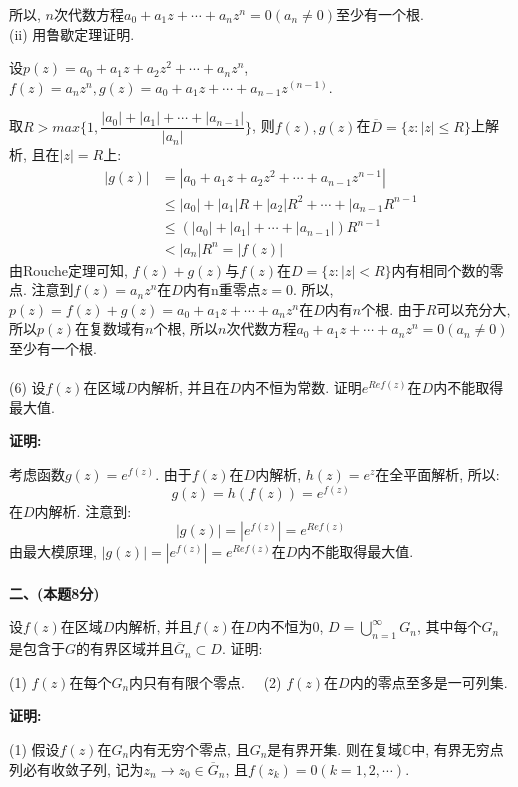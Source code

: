 \documentclass{article}
\begin{document}
所以, $n$次代数方程$a_0 + a_1z + \cdots + a_n z^n =0(a_n \neq 0)$至少有一个根. \\

(ii) 用鲁歇定理证明. 

设$p(z) = a_0 + a_1z + a_2z^2 + \cdots + a_nz^n$, $f(z) = a_n z^n, g(z) = a_0 + a_1 z + \cdots + a_{n-1}z^{(n-1)}$. 

取$R > max \{1, \dfrac{|a_0| + |a_1| + \cdots + |a_{n-1}|}{|a_n|} \}$, 则$f(z), g(z)$在$\overline{D} = \{ z: |z| \leq R \}$上解析, 且在$|z| = R$上:
\begin{align*}
|g(z)| &= |a_0 + a_1z + a_2z^2 + \cdots + a_{n-1}z^{n-1}| \\
       & \leq |a_0| + |a_1|R + |a_2|R^2 + \cdots + |a_{n-1}R^{n-1} \\
       & \leq \left(|a_0| + |a_1| + \cdots + |a_{n-1}|  \right) R^{n-1} \\
       & < |a_n|R^n = |f(z)|
\end{align*}
由Rouche定理可知, $f(z) + g(z)$与$f(z)$在$D = \{z:|z|<R  \}$内有相同个数的零点. 注意到$f(z) = a_nz^n$在$D$内有n重零点$z=0$. 所以, $p(z) = f(z) + g(z) = a_0 + a_1 z + \cdots + a_nz^n$在$D$内有$n$个根. 由于$R$可以充分大, 所以$p(z)$在复数域有$n$个根, 所以$n$次代数方程$a_0 + a_1z + \cdots + a_n z^n =0(a_n \neq 0)$至少有一个根.  \\  \\


(6) 设$f(z)$在区域$D$内解析, 并且在$D$内不恒为常数. 证明$e^{Re f(z)}$在$D$内不能取得最大值.

\textbf{证明:} 

考虑函数$g(z) = e^{f(z)}$. 由于$f(z)$在$D$内解析, $h(z)= e^z$在全平面解析, 所以:
$$ g(z) = h(f(z)) = e^{f(z)} $$
在$D$内解析. 注意到:
$$ |g(z)| = |e^{f(z)}| = e^{Re f(z)} $$
由最大模原理, $|g(z)| = |e^{f(z)}| = e^{Ref(z)}$在$D$内不能取得最大值. \\  \\

\textbf{二、(本题8分)}

设$f(z)$在区域$D$内解析, 并且$f(z)$在$D$内不恒为0, $D = \bigcup\limits_{n=1}^{\infty} G_n$, 其中每个$G_n$是包含于$G$的有界区域并且$\overline{G}_n \subset D$. 证明:

(1) $f(z)$在每个$G_n$内只有有限个零点. \ \ (2) $f(z)$在$D$内的零点至多是一可列集. 

\textbf{证明:} 

(1) 假设$f(z)$在$G_n$内有无穷个零点, 且$G_n$是有界开集. 则在复域$\mathbb{C}$中, 有界无穷点列必有收敛子列, 记为$z_n \rightarrow z_0 \in \overline{G}_n$, 且$f(z_k) = 0(k=1,2, \cdots)$.
\end{document}
